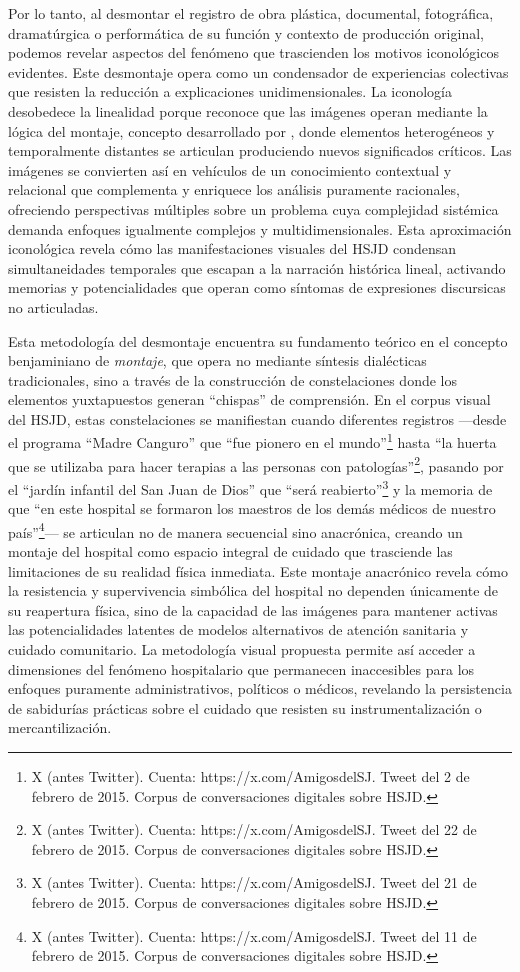 \textcolor{edit30sept}{Por lo tanto, al desmontar el registro de obra plástica, documental, fotográfica, dramatúrgica o performática de su función y contexto de producción original, podemos revelar aspectos del fenómeno que trascienden los motivos iconológicos evidentes. Este desmontaje opera como un condensador de experiencias colectivas que resisten la reducción a explicaciones unidimensionales. La iconología desobedece la linealidad porque reconoce que las imágenes operan mediante la lógica del montaje, concepto desarrollado por \cite{Benjamin2004}, donde elementos heterogéneos y temporalmente distantes se articulan produciendo nuevos significados críticos. Las imágenes se convierten así en vehículos de un conocimiento contextual y relacional que complementa y enriquece los análisis puramente racionales, ofreciendo perspectivas múltiples sobre un problema cuya complejidad sistémica demanda enfoques igualmente complejos y multidimensionales. Esta aproximación iconológica revela cómo las manifestaciones visuales del HSJD condensan simultaneidades temporales que escapan a la narración histórica lineal, activando memorias y potencialidades que operan como síntomas de expresiones discursicas no articuladas.}

Esta metodología del desmontaje encuentra su fundamento teórico en el concepto benjaminiano de \textit{montaje}, que opera no mediante síntesis dialécticas tradicionales, sino a través de la construcción de constelaciones donde los elementos yuxtapuestos generan ``chispas'' de comprensión. En el corpus visual del HSJD, estas constelaciones se manifiestan cuando diferentes registros —desde el programa ``Madre Canguro'' que ``fue pionero en el mundo''\footnote{X (antes Twitter). Cuenta: https://x.com/AmigosdelSJ. Tweet del 2 de febrero de 2015. Corpus de conversaciones digitales sobre HSJD.} hasta ``la huerta que se utilizaba para hacer terapias a las personas con patologías''\footnote{X (antes Twitter). Cuenta: https://x.com/AmigosdelSJ. Tweet del 22 de febrero de 2015. Corpus de conversaciones digitales sobre HSJD.}, pasando por el ``jardín infantil del San Juan de Dios'' que ``será reabierto''\footnote{X (antes Twitter). Cuenta: https://x.com/AmigosdelSJ. Tweet del 21 de febrero de 2015. Corpus de conversaciones digitales sobre HSJD.} y la memoria de que ``en este hospital se formaron los maestros de los demás médicos de nuestro país''\footnote{X (antes Twitter). Cuenta: https://x.com/AmigosdelSJ. Tweet del 11 de febrero de 2015. Corpus de conversaciones digitales sobre HSJD.}— se articulan no de manera secuencial sino anacrónica, creando un montaje del hospital como espacio integral de cuidado que trasciende las limitaciones de su realidad física inmediata. Este montaje anacrónico revela cómo la resistencia y supervivencia simbólica del hospital no dependen únicamente de su reapertura física, sino de la capacidad de las imágenes para mantener activas las potencialidades latentes de modelos alternativos de atención sanitaria y cuidado comunitario. La metodología visual propuesta permite así acceder a dimensiones del fenómeno hospitalario que permanecen inaccesibles para los enfoques puramente administrativos, políticos o médicos, revelando la persistencia de sabidurías prácticas sobre el cuidado que resisten su instrumentalización o mercantilización.

